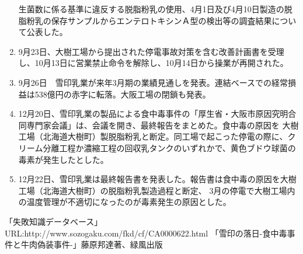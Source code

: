 \documentclass[twocolumn,titlepage]{jsarticle}
\begin{document}
\begin{enumerate}
    生菌数に係る基準に違反する脱脂粉乳の使用、4月1日及び4月10日製造の脱脂粉乳の保存サンプルからエンテロトキシンＡ型の検出等の調査結果について公表した。
 \item 9月23日、大樹工場から提出された停電事故対策を含む改善計画書を受理し、10月13日に営業禁止命令を解除し、10月14日から操業が再開された。
 \item 9月26日　雪印乳業が来年3月期の業績見通しを発表。連結ベースでの経常損益は538億円の赤字に転落。大阪工場の閉鎖も発表。
 \item 12月20日、雪印乳業の製品による食中毒事件の「厚生省・大阪市原因究明合同専門家会議」は、会議を開き、最終報告をまとめた。食中毒の原因を
 大樹工場（北海道大樹町）製脱脂粉乳と断定。同工場で起こった停電の際に、クリーム分離工程か濃縮工程の回収乳タンクのいずれかで、黄色ブドウ球菌の毒素が発生したとした。
 \item 12月22日、雪印乳業は最終報告書を発表した。報告書は食中毒の原因を大樹工場（北海道大樹町）の脱脂粉乳製造過程と断定、
  3月の停電で大樹工場内の温度管理が不適切になったのが毒素発生の原因とした。
\end{enumerate}


\newpage
\begin{thebibliography}{2}
 「失敗知識データベース」 URL:http://www.sozogaku.com/fkd/cf/CA0000622.html
 「雪印の落日-食中毒事件と牛肉偽装事件-」藤原邦達著、緑風出版
\end{thebibliography}
\end{document}
